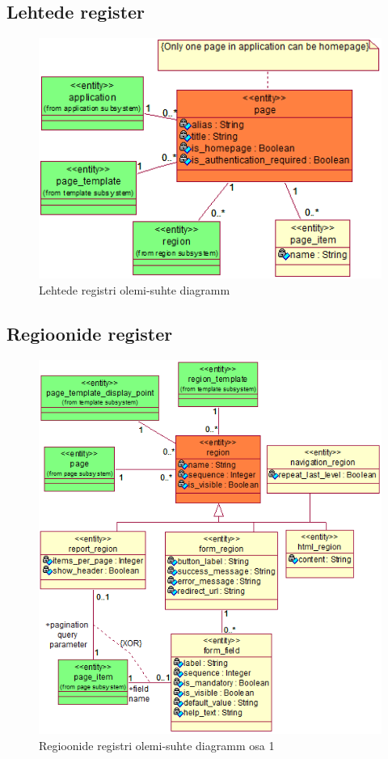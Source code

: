\documentclass[a4paper,12pt]{article} %
\begin{document}
\subsection{Lehtede register}
\begin{figure}[H]
\begin{center}
\includegraphics[bb=0 0 438 307,scale=1]{./diagrams/page-er-diagram.png}
\caption{Lehtede registri olemi-suhte diagramm}
\label{fig_lehtede_registri_olemi_suhte_diagramm}
\end{center}
\end{figure}


\subsection{Regioonide register}
\begin{figure}[H]
\begin{center}
\includegraphics[bb=0 0 519 566,scale=1]{./diagrams/region-er-diagram.png}
\caption{Regioonide registri olemi-suhte diagramm osa 1}
\label{fig_regioonide_registri_olemi_suhte_diagramm}
\end{center}
\end{figure}
\end{document}
